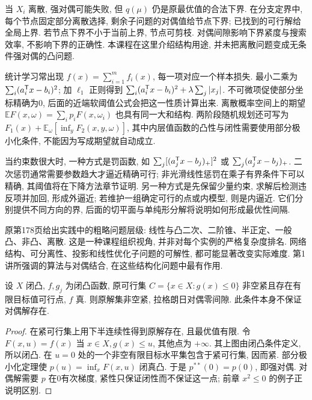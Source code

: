 当 $X_i$ 离散, 强对偶可能失败, 但 $q(\mu)$ 仍是原最优值的合法下界. 在分支定界中, 每个节点固定部分离散选择, 剩余子问题的对偶值给节点下界; 已找到的可行解给全局上界. 若节点下界不小于当前上界, 节点可剪枝. 对偶间隙影响下界紧度与搜索效率, 不影响下界的正确性. 本课程在这里介绍结构用途, 并未把离散问题变成无条件强对偶的凸问题.

统计学习常出现 $f(x)=\sum_{i=1}^m f_i(x)$, 每一项对应一个样本损失. 最小二乘为 $\sum_i(a_i^{\mathsf T} x-b_i)^2$; 加 $\ell_1$ 正则得到
$\sum_i(a_i^{\mathsf T} x-b_i)^2+\lambda\sum_j|x_j|$. 不可微项促使部分坐标精确为0, 后面的近端软阈值公式会把这一性质计算出来. 离散概率空间上的期望 $\mathbb E F(x,\omega)=\sum_i p_iF(x,\omega_i)$ 也具有同一大和结构. 两阶段随机规划还可写为 $F_1(x)+\mathbb E_\omega[\inf_yF_2(x,y,\omega)]$, 其中内层值函数的凸性与闭性需要使用部分极小化条件, 不能因为写成期望就自动成立.

当约束数很大时, 一种方式是罚函数, 如 $\sum_j[(a_j^{\mathsf T} x-b_j)_+]^2$ 或 $\sum_j(a_j^{\mathsf T} x-b_j)_+$. 二次惩罚通常需要参数趋大才逼近精确可行; 非光滑线性惩罚在乘子有界条件下可以精确, 其阈值将在下降方法章节证明. 另一种方式是先保留少量约束, 求解后检测违反项并加回, 形成外逼近; 若维护一组确定可行的点或内模型, 则是内逼近. 它们分别提供不同方向的界, 后面的切平面与单纯形分解将说明如何形成最优性间隔.

原第178页给出实践中的粗略问题层级: 线性与凸二次、二阶锥、半正定、一般凸、非凸、离散. 这是一种课程组织视角, 并非对每个实例的严格复杂度排名. 网络结构、可分离性、投影和线性优化子问题的可解性, 都可能显著改变实际难度. 第1讲所强调的算法与对偶结合, 在这些结构化问题中最有作用.

\begin{proposition}
设 $X$ 闭凸, $f,g_j$ 为闭凸函数, 原可行集 $C=\{x\in X:g(x)\le0\}$ 非空紧且存在有限目标值可行点, $f$ 真. 则原解集非空紧, 拉格朗日对偶零间隙. 此条件本身不保证对偶解存在.
\end{proposition}
\begin{proof}
在紧可行集上用下半连续性得到原解存在, 且最优值有限. 令 $F(x,u)=f(x)$ 当 $x\in X,g(x)\le u$, 其他点为 $+\infty$. 其上图由闭凸条件定义, 所以闭凸. 在 $u=0$ 处的一个非空有限目标水平集包含于紧可行集, 因而紧. 部分极小化定理使 $p(u)=\inf_xF(x,u)$ 闭真凸. 于是 $p^{**}(0)=p(0)$, 即强对偶. 对偶解需要 $p$ 在0有次梯度, 紧性只保证闭性而不保证这一点; 前章 $x^2\le0$ 的例子正说明区别.
\end{proof}
